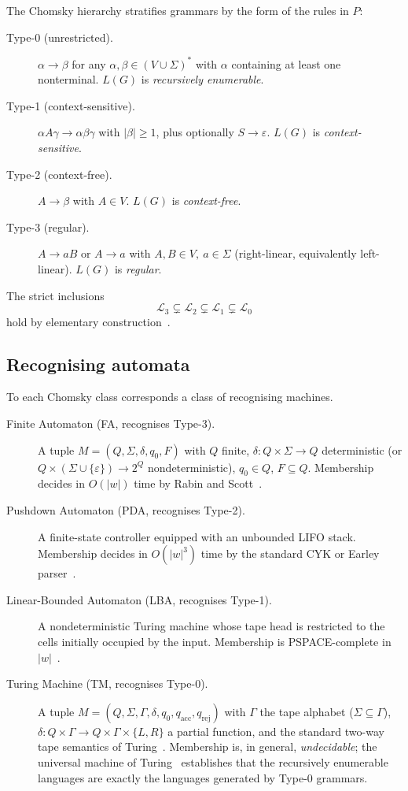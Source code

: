 The Chomsky hierarchy stratifies grammars by the form of the
rules in $P$:
\begin{description}
\item[Type-0 (unrestricted).]
$\alpha \to \beta$ for any $\alpha,\beta\in (V\cup\Sigma)^*$ with
$\alpha$ containing at least one nonterminal.  $L(G)$ is
\emph{recursively enumerable}.
\item[Type-1 (context-sensitive).]
$\alpha A \gamma \to \alpha\beta\gamma$ with $|\beta|\ge 1$, plus
optionally $S\to\varepsilon$.  $L(G)$ is \emph{context-sensitive}.
\item[Type-2 (context-free).]
$A \to \beta$ with $A\in V$.  $L(G)$ is \emph{context-free}.
\item[Type-3 (regular).]
$A \to aB$ or $A \to a$ with $A,B\in V,\ a\in\Sigma$ (right-linear,
equivalently left-linear).  $L(G)$ is \emph{regular}.
\end{description}
The strict inclusions
\[
\mathcal{L}_3 \subsetneq \mathcal{L}_2 \subsetneq \mathcal{L}_1
\subsetneq \mathcal{L}_0
\]
hold by elementary
construction~\cite{hopcroft2006automata}.

\subsection{Recognising automata}

To each Chomsky class corresponds a class of recognising machines.
\begin{description}
\item[Finite Automaton (FA, recognises Type-3).]
A tuple $M = (Q, \Sigma, \delta, q_0, F)$ with $Q$ finite,
$\delta: Q \times \Sigma \to Q$ deterministic (or $Q \times
(\Sigma \cup \{\varepsilon\}) \to 2^Q$ nondeterministic),
$q_0\in Q$, $F\subseteq Q$.  Membership decides in $O(|w|)$
time by Rabin and Scott~\cite{rabin1959finite}.
\item[Pushdown Automaton (PDA, recognises Type-2).]
A finite-state controller equipped with an unbounded LIFO stack.
Membership decides in $O(|w|^3)$ time by the standard CYK or
Earley parser~\cite{aho1972theory}.
\item[Linear-Bounded Automaton (LBA, recognises Type-1).]
A nondeterministic Turing machine whose tape head is restricted to
the cells initially occupied by the input.  Membership is
PSPACE-complete in $|w|$~\cite{hopcroft2006automata}.
\item[Turing Machine (TM, recognises Type-0).]
A tuple $M = (Q, \Sigma, \Gamma, \delta, q_0, q_\text{acc},
q_\text{rej})$ with $\Gamma$ the tape alphabet
($\Sigma\subseteq\Gamma$), $\delta: Q\times\Gamma \to Q\times
\Gamma\times\{L,R\}$ a partial function, and the standard
two-way tape semantics of
Turing~\cite{turing1936computable}.  Membership is, in general,
\emph{undecidable}; the universal machine of
Turing~\cite{turing1936computable} establishes that the
recursively enumerable languages are exactly the languages
generated by Type-0 grammars.
\end{description}

